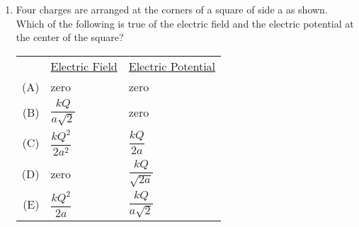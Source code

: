 \documentclass{../../../oss-apphys}
\begin{document}
\begin{multicols}{2}
\begin{enumerate}[leftmargin=18pt]
  \item Four charges are arranged at the corners of a square of side a as shown.
    Which of the following is true of the electric field and the electric
    potential at the center of the square?
    \begin{center}
    \end{center}
    \begin{tabular}{rll}
      & \underline{Electric Field} & \underline{Electric Potential}\\
      (A) & zero & zero \\
      (B) & $\dfrac{kQ}{a\sqrt{2}}$ & zero \\
      (C) & $\dfrac{kQ^2}{2a^2}$ &  $\dfrac{kQ}{2a}$\\
      (D) & zero &  $\dfrac{kQ}{\sqrt{2a}}$\\
      (E) & $\dfrac{kQ^2}{2a}$ & $\dfrac{kQ}{a\sqrt{2}}$
    \end{tabular}

    \columnbreak
    

\end{enumerate}
\end{multicols}
\end{document}
